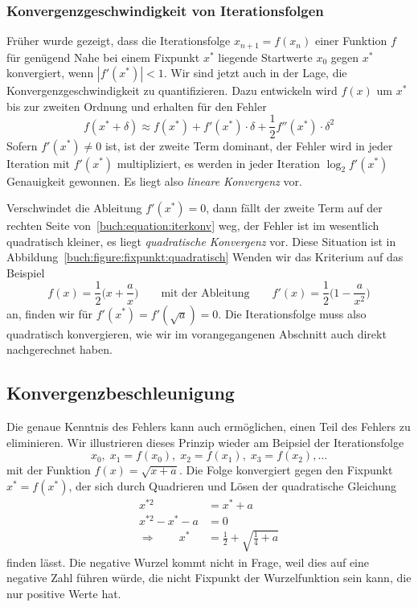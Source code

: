 \subsubsection{Konvergenzgeschwindigkeit von Iterationsfolgen}

Früher wurde gezeigt, dass die Iterationsfolge $x_{n+1}=f(x_n)$ einer
Funktion $f$ für genügend Nahe bei einem Fixpunkt $x^*$ liegende
Startwerte $x_0$ gegen $x^*$ konvergiert, wenn $|f'(x^*)| < 1$.
Wir sind jetzt auch in der Lage, die Konvergenzgeschwindigkeit
zu quantifizieren.
Dazu entwickeln wird $f(x)$ um $x^*$ bis zur zweiten Ordnung und
erhalten für den Fehler
\begin{equation}
f(x^*+\delta)
\approx
f(x^*) + f'(x^*) \cdot \delta + \frac12f''(x^*)\cdot \delta^2
\label{buch:equation:iterkonv}
\end{equation}
Sofern $f'(x^*)\ne 0$ ist, ist der zweite Term dominant, der Fehler
wird in jeder Iteration mit $f'(x^*)$ multipliziert, es werden in
jeder Iteration $\log_2 f'(x^*)$ Genauigkeit gewonnen.
Es liegt also {\em lineare Konvergenz} vor.
%
%
%

Verschwindet die Ableitung $f'(x^*)=0$, dann fällt der zweite Term
auf der rechten Seite von~\eqref{buch:equation:iterkonv} weg, der
Fehler ist im wesentlich quadratisch kleiner, es liegt {\em quadratische
Konvergenz} vor.
%
%
%
Diese Situation ist in Abbildung~\ref{buch:figure:fixpunkt:quadratisch}
Wenden wir das Kriterium auf das Beispiel 
\[
f(x) = \frac12\biggl( x + \frac{a}{x}\biggr)
\qquad\text{mit der Ableitung}\qquad
f'(x) = \frac12\biggl( 1 -\frac{a}{x^2}\biggr)
\]
an, finden wir für $f'(x^*)=f'(\sqrt{a}) = 0$.
Die Iterationsfolge muss also quadratisch konvergieren, wie wir
im vorangegangenen Abschnitt auch direkt nachgerechnet haben.

%
%
\subsection{Konvergenzbeschleunigung
\label{buch:subsection:konvergenzbeschleunigung}}
%
Die genaue Kenntnis des Fehlers kann auch ermöglichen, einen Teil
des Fehlers zu eliminieren.
Wir illustrieren dieses Prinzip wieder am Beipsiel der Iterationsfolge
\[
x_0,\; x_1=f(x_0),\; x_2=f(x_1),\;x_3=f(x_2),\dots
\]
mit der Funktion $f(x)=\sqrt{x+a}$.
Die Folge konvergiert gegen den Fixpunkt $x^* = f(x^*)$, der
sich durch Quadrieren und Lösen der quadratische
Gleichung
\begin{align*}
x^{*2} &= x^*+a\\
x^{*2} - x^*-a&=0\\
\Rightarrow\qquad
x^* &= \frac12 +\sqrt{\frac14+a}
\end{align*}
finden lässt.
Die negative Wurzel kommt nicht in Frage, weil dies auf eine negative Zahl
führen würde, die nicht Fixpunkt der Wurzelfunktion sein kann, die nur
positive Werte hat.

